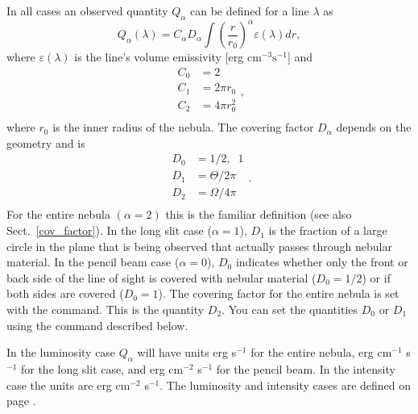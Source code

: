 In all cases an observed quantity $Q_{\alpha }$ can be defined for a
line $\lambda $ as
\begin{equation}
Q_\alpha  \left( \lambda  \right) = C_\alpha  D_\alpha  \int {\left(
{\frac{r}{{r_0 }}} \right)^\alpha  } \varepsilon \left( \lambda  \right)dr
,%
\end{equation}
where $\varepsilon (\lambda )$ is the line's volume emissivity [erg
cm$^{-3} \mathrm{s}^{-1}$] and
\begin{equation}
\begin{array}{ll}
 C_0&  = 2 \\
 C_1&  = 2\pi r_{\mathrm{0}}  \\
 C_2&  = 4\pi r_{\mathrm{0}}^{\mathrm{2}}  \\
 \end{array},%
\end{equation}
where $r_{\mathrm{0}}$ is the inner radius of the nebula.  The covering factor
$D_\alpha $ depends
on the geometry and is
\begin{equation}
\label{aper_cover}
\begin{array}{ll}
 D_0&  = 1/2,\;\;1 \\
 D_1&  = \Theta /2\pi  \\
 D_2&  = \Omega /4\pi  \\
 \end{array}
.%
\end{equation}
For the entire nebula $(\alpha  = 2)$ this is the familiar definition
(see also Sect.~\ref{cov_factor}).
In the long
slit case ($\alpha  = 1$), $D_1$ is the fraction of a large circle in the plane that
is being observed that actually passes through nebular material.
In the pencil
beam case ($\alpha  = 0$), $D_0$ indicates whether only the front or back side of the
line of sight is covered with nebular material ($D_0 = 1/2$)
or if both sides
are covered ($D_0 = 1$).
The covering factor for the entire nebula is set
with the  command. This is the quantity $D_2$.
You can set the quantities $D_0$ or $D_1$ using the 
command described below.

In the luminosity case $Q_\alpha $ will have units erg s$^{-1}$
for the entire nebula,
erg cm$^{-1}$ s$^{-1}$ for the long slit case,
and erg cm$^{-2}$ s$^{-1}$ for the pencil beam.
In the intensity case the units are erg cm$^{-2}$ s$^{-1}$.
The luminosity and intensity cases
are defined on page \pageref{sec:IntensityLuminosityCases}.

